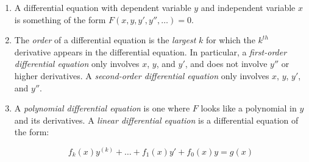 \documentclass{amsart}
\begin{document}
\begin{enumerate}
\item A differential equation with dependent variable $y$ and
  independent variable $x$ is something of the form
  $F(x,y,y',y'',\dots) = 0$.
\item The {\em order} of a differential equation is the {\em largest}
  $k$ for which the $k^{th}$ derivative appears in the differential
  equation. In particular, a {\em first-order differential equation}
  only involves $x$, $y$, and $y'$, and does not involve $y''$ or
  higher derivatives. A {\em second-order differential equation} only
  involves $x$, $y$, $y'$, and $y''$.
\item A {\em polynomial differential equation} is one where $F$ looks
  like a polynomial in $y$ and its derivatives. A {\em linear
  differential equation} is a differential equation of the form:

  $$f_k(x)y^{(k)} + \dots + f_1(x)y' + f_0(x)y = g(x)$$


\end{enumerate}
\end{document}
